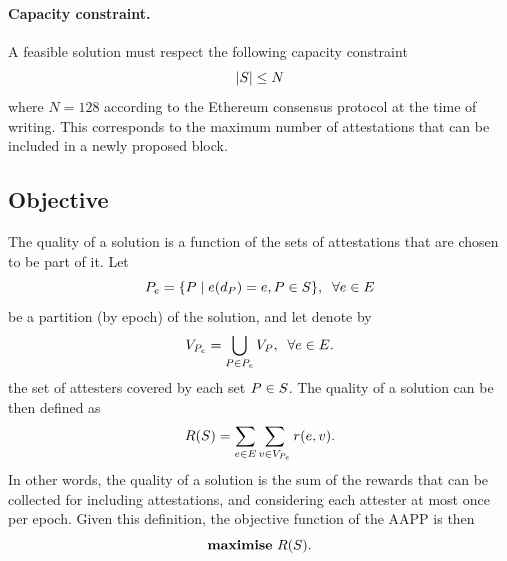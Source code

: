 \documentclass{article}
\begin{document}
\paragraph{\textbf{Capacity constraint.}} A feasible solution \solution{} must
respect the following capacity constraint 
%
\begin{equation}
  |S| \leq N
\end{equation}
%
where $N = 128$ according to the Ethereum consensus protocol at the time of
writing. This corresponds to the maximum number of attestations that can be
included in a newly proposed block.


\subsection{Objective}

\newcommand{\Reward}[1]{\ensuremath{R(#1)}}

The quality of a solution \solution{} is a function of the sets of attestations
that are chosen to be part of it. Let 
\begin{equation}
  P_e = \{ P \mid e(d_{P}) = e, P \in S \},\;\; \forall e \in E
\end{equation}
%
be a partition (by epoch) of the solution, and let denote by
\begin{equation}
  V_{P_e} = \bigcup_{P \in P_e} V_{P},\;\; \forall e \in E.
\end{equation}
the set of attesters covered by each set $P \in S{}$. The quality of a
solution can be then defined as
%
\begin{equation}
  \Reward{\solution} = \sum_{e \in \epochs}\sum_{\attester \in
  \attesters{P_e}}\reward{e}{\attester}.
\end{equation}
%
In other words, the quality of a solution is the sum of the rewards that can be
collected for including attestations, and considering each attester at most
once per epoch. Given this definition, the objective function of the AAPP is
then 
%
\begin{equation}
  \mathbf{maximise}~\Reward{\solution}.
\end{equation}
\end{document}
